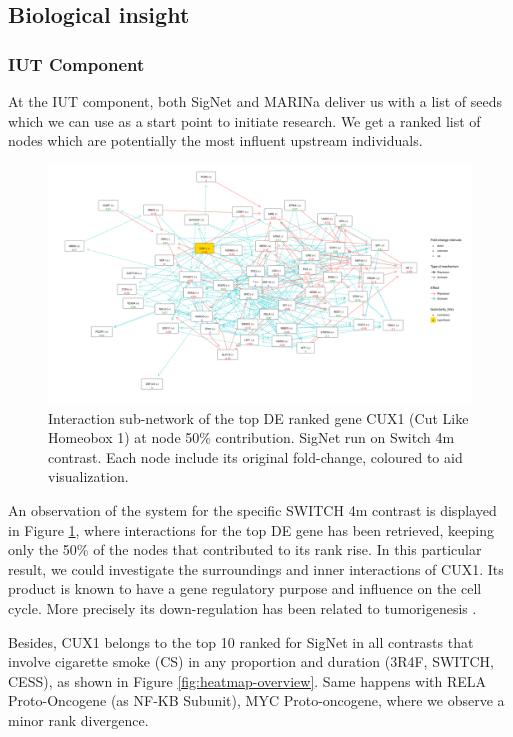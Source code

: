 \subsection{Biological insight}
\subsubsection{IUT Component}
At the IUT component, both SigNet and MARINa deliver us with a list of seeds which we can use as a start point to initiate research. We get a ranked list of nodes which are potentially the most influent upstream individuals.
\\

\begin{figure}[!ht]
    \centering
    \includegraphics[width=\textwidth, height=\textheight, keepaspectratio]{Major Thesis/figures/iut/graph/SWITCH4m50-CUX1.png}
    \caption{Interaction sub-network of the top DE ranked gene CUX1 (Cut Like Homeobox 1) at node 50\% contribution. SigNet run on Switch 4m contrast. Each node include its original fold-change, coloured to aid visualization.}
    \label{fig:graph-expansion}
\end{figure}

An observation of the system for the specific SWITCH 4m contrast is displayed in Figure \ref{fig:graph-expansion}, where interactions for the top DE gene has been retrieved, keeping only the 50\% of the nodes that contributed to its rank rise. In this particular result, we could investigate the surroundings and inner interactions of CUX1. Its product is known to have a gene regulatory purpose and influence on the cell cycle. More precisely its down-regulation has been related to tumorigenesis \cite{Wong2014InactivatingTumorigenesis}.


Besides, CUX1 belongs to the top 10 ranked for SigNet in all contrasts that involve cigarette smoke (CS) in any proportion and duration (3R4F, SWITCH, CESS), as shown in Figure \ref{fig:heatmap-overview}. Same happens with RELA Proto-Oncogene (as NF-KB Subunit), MYC Proto-oncogene, where we observe a minor rank divergence.
\\

